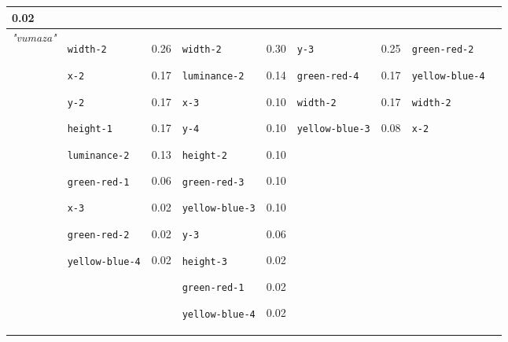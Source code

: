 {\begin{tabular}{@{}p{0.95cm}|p{1.9cm}@{}p{0.6cm}@{}|p{1.9cm}@{}p{0.6cm}@{}|p{1.9cm}@{}p{0.6cm}@{}|p{1.9cm}@{}p{0.5cm}@{}}
0.02\\
\hline
\textit{"vumaza"} & \texttt{width-2}

\texttt{x-2}

\texttt{y-2}

\texttt{height-1}

\texttt{luminance-2}

\texttt{green-red-1}

\texttt{x-3}

\texttt{green-red-2}

\texttt{yellow-blue-4} & 0.26

0.17

0.17

0.17

0.13

0.06

0.02

0.02

0.02 & \texttt{width-2}

\texttt{luminance-2}

\texttt{x-3}

\texttt{y-4}

\texttt{height-2}

\texttt{green-red-3}

\texttt{yellow-blue-3}

\texttt{y-3}

\texttt{height-3}

\texttt{green-red-1}

\texttt{yellow-blue-4} & 0.30

0.14

0.10

0.10

0.10

0.10

0.10

0.06

0.02

0.02

0.02 & \texttt{y-3}

\texttt{green-red-4}

\texttt{width-2}

\texttt{yellow-blue-3} & 0.25

0.17

0.17

0.08 & \texttt{green-red-2}

\texttt{yellow-blue-4}

\texttt{width-2}

\texttt{x-2}


\end{tabular}}

